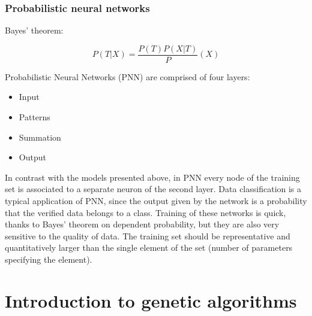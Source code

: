 \documentclass[10pt,oneside]{memoir}
\begin{document}
\section{Probabilistic neural networks}
\label{probabilisticneuralnetworks}

Bayes' theorem:


\begin{equation}
P\left(T|X\right)=\frac{P\left(T\right)P\left(X|T\right)}{P}\left(X\right)
\end{equation}


Probabilistic Neural Networks (PNN) are comprised of four layers:


\begin{itemize}


\item Input

\item Patterns

\item Summation

\item Output
\end{itemize}

In contrast with the models presented above, in PNN every node of the training set is associated to a separate neuron of the second layer.
Data classification is a typical application of PNN, since the output given by the network is a probability that the verified data belongs to a class. Training of these networks is quick, thanks to Bayes' theorem on dependent probability, but they are also very sensitive to the quality of data. The training set should be representative and quantitatively larger than the single element of the set (number of parameters specifying the element).


\part{Introduction to genetic algorithms}
\label{chapter4}
\end{document}

